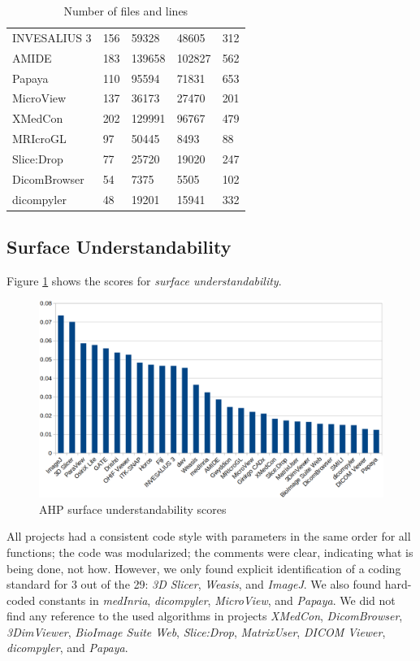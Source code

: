 \documentclass[3p, 12pt,authoryear]{elsarticle}
\begin{document}
\begin{table}[ht]
\begin{tabular}{lllll}
INVESALIUS 3 & 156 & 59328 & 48605 & 312 \\
AMIDE & 183 & 139658 & 102827 & 562 \\
Papaya & 110 & 95594 & 71831 & 653 \\
MicroView & 137 & 36173 & 27470 & 201 \\
XMedCon & 202 & 129991 & 96767 & 479 \\
MRIcroGL & 97 & 50445 & 8493 & 88 \\
Slice:Drop & 77 & 25720 & 19020 & 247 \\
DicomBrowser & 54 & 7375 & 5505 & 102 \\
dicompyler & 48 & 19201 & 15941 & 332 \\ \hline
\end{tabular}
\caption{\label{tab_loc_per_file}Number of files and lines}
\end{table}

\subsection{Surface Understandability} \label{sec_result_understandability}

Figure \ref{fg_surface_understandability_scores} shows the scores for
\textit{surface understandability}.

\begin{figure}[ht]
\includegraphics[scale=0.38]{figures/understandability_scores.png}
\caption{AHP surface understandability scores}
\label{fg_surface_understandability_scores}
\end{figure}

All projects had a consistent code style with parameters in the same order for
all functions; the code was modularized; the comments were clear, indicating
what is being done, not how. However, we only found explicit identification of a
coding standard for 3 out of the 29: \textit{3D Slicer}, \textit{Weasis}, and
\textit{ImageJ}. We also found hard-coded constants in \textit{medInria},
\textit{dicompyler}, \textit{MicroView}, and \textit{Papaya}. We did not find
any reference to the used algorithms in projects \textit{XMedCon},
\textit{DicomBrowser}, \textit{3DimViewer}, \textit{BioImage Suite Web},
\textit{Slice:Drop}, \textit{MatrixUser}, \textit{DICOM Viewer},
\textit{dicompyler}, and \textit{Papaya}. 
\end{document}
